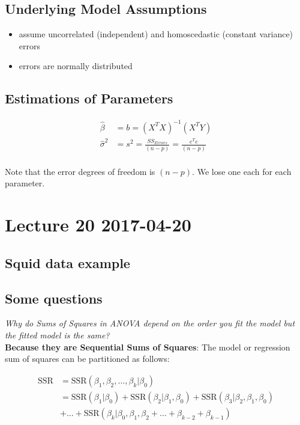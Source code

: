 \documentclass[a4paper, 11pt, twoside]{article}
\begin{document}
\subsection{Underlying Model Assumptions}

\begin{itemize}
	\item assume uncorrelated (independent) and homoscedastic (constant variance) errors
	\item errors are normally distributed
\end{itemize}

\subsection{Estimations of Parameters}
\[
\begin{split}
	\hat{\beta}&=b=(X^TX)^{-1}(X^TY)\\
	\hat{\sigma}^2&=s^2=\frac{SS_{Errors}}{(n-p)}=\frac{e^Te}{(n-p)}\\
\end{split}
\]

Note that the error degrees of freedom is $(n-p)$. We lose one each for each parameter.

\section{Lecture 20 2017-04-20}
 
\subsection{Squid data example}

\subsection{Some questions}

\textit{Why do Sums of Squares in ANOVA depend on the order you fit the model but the fitted model is the same?}\\

\textbf{Because they are Sequential Sums of Squares}: The model or regression sum of squares can be partitioned as follows:

\[
\begin{split}
	\text{SSR}&=\text{SSR}(\beta_1,\beta_2,\dots, \beta_k|\beta_0)\\
	&=\text{SSR}(\beta_1|\beta_0)+\text{SSR}(\beta_2|\beta_1,\beta_0)+\text{SSR}(\beta_3|\beta_2,\beta_1,\beta_0)\\
	&+\dots+\text{SSR}(\beta_k|\beta_0,\beta_1,\beta_2+\dots +\beta_{k-2}+\beta_{k-1})	
\end{split}
\]
\end{document}
